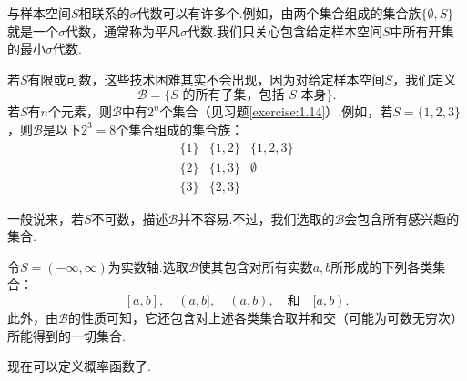 与样本空间$S$相联系的$\sigma$代数可以有许多个.例如，由两个集合组成的集合族$\{\emptyset,S\}$就是一个$\sigma$代数，通常称为平凡$\sigma$代数.我们只关心包含给定样本空间$S$中所有开集的最小$\sigma$代数.
\begin{example}[$\sigma$代数——I]\label{ex:1.2.2}
若$S$有限或可数，这些技术困难其实不会出现，因为对给定样本空间$S$，我们定义
$$\mathscr B=\{S\text{ 的所有子集，包括 }S\text{ 本身}\}.$$
若$S$有$n$个元素，则$\mathscr B$中有$2^n$个集合（见习题\ref{exercise:1.14}）.例如，若$S=\{1,2,3\}$，则$\mathscr B$是以下$2^3=8$个集合组成的集合族：
$$\begin{array}{ccc}
\{1\}&\{1,2\}&\{1,2,3\}\\[3pt]
\{2\}&\{1,3\}&\emptyset\\[3pt]
\{3\}&\{2,3\}&
\end{array}$$
\end{example}
一般说来，若$S$不可数，描述$\mathscr B$并不容易.不过，我们选取的$\mathscr B$会包含所有感兴趣的集合.
\begin{example}[$\sigma$代数——II]\label{ex:1.2.3}
令$S=(-\infty,\infty)$为实数轴.选取$\mathscr B$使其包含对所有实数$a,b$所形成的下列各类集合：
$$[a,b],\quad(a,b],\quad(a,b),\quad\text{和}\quad[a,b).$$
此外，由$\mathscr B$的性质可知，它还包含对上述各类集合取并和交（可能为可数无穷次）所能得到的一切集合.
\end{example}
现在可以定义概率函数了.


